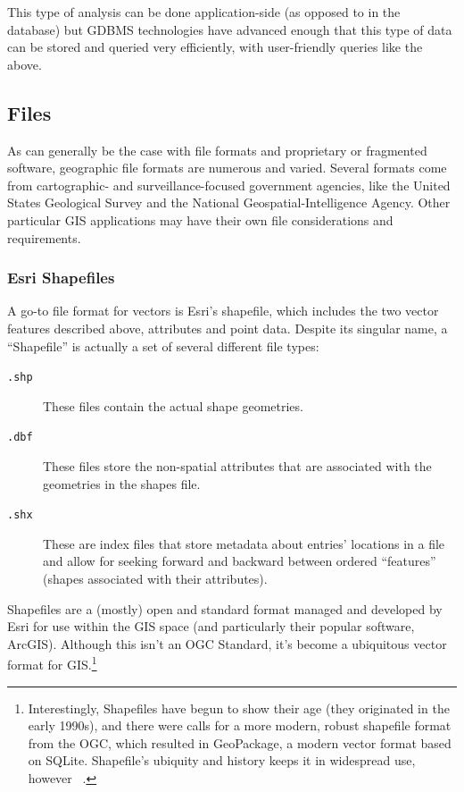 This type of analysis can be done application-side (as opposed to in the database) but GDBMS technologies have advanced enough that this type of data can be stored and queried very efficiently, with user-friendly queries like the above.

\subsection{Files}
\label{background_formats}
As can generally be the case with file formats and proprietary or fragmented software, geographic file formats are numerous and varied. Several formats come from cartographic- and surveillance-focused government agencies, like the United States Geological Survey and the National Geospatial-Intelligence Agency. Other particular GIS applications may have their own file considerations and requirements.

\subsubsection{Esri Shapefiles}
A go-to file format for vectors is Esri's shapefile, which includes the two vector features described above, attributes and point data. Despite its singular name, a ``Shapefile'' is actually a set of several different file types:

\begin{description}
  \item[\tt{.shp}] These files contain the actual shape geometries.
  \item[\tt{.dbf}] These files store the non-spatial attributes that are associated with the geometries in the shapes file.
  \item[\tt{.shx}] These are index files that store metadata about entries' locations in a file and allow for seeking forward and backward between ordered ``features'' (shapes associated with their attributes).
\end{description}

Shapefiles are a (mostly) open and standard format managed and developed by Esri for use within the GIS space (and particularly their popular software, ArcGIS). Although this isn't an OGC Standard, it's become a ubiquitous vector format for GIS.\footnote{Interestingly, Shapefiles have begun to show their age (they originated in the early 1990s), and there were calls for a more modern, robust shapefile format from the OGC, which resulted in GeoPackage, a modern vector format based on SQLite. Shapefile's ubiquity and history keeps it in widespread use, however ~\cite{slashgeo,GeoPackage}.}

